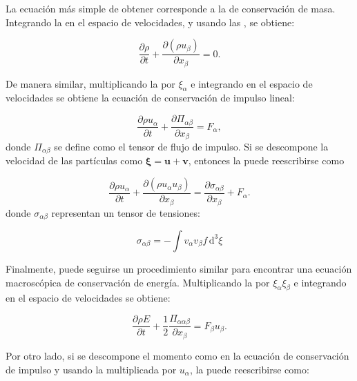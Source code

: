 La ecuaci\'on m\'as simple de obtener corresponde a la de conservaci\'on de masa. Integrando la  en el espacio de velocidades, y usando las , se obtiene:

\begin{equation}
	\dfrac{\partial \rho}{\partial t} + \dfrac{\partial (\rho u_{\beta})}{\partial x_{\beta}} = 0.
\end{equation}

De manera similar, multiplicando la  por $\xi_{\alpha}$ e integrando en el espacio de velocidades se obtiene la ecuaci\'on de conservaci\'on de impulso lineal:

\begin{equation}
	\dfrac{\partial \rho u_{\alpha}}{\partial t} + \dfrac{\partial \Pi_{\alpha \beta}}{\partial x_{\beta}} = F_{\alpha},
	\label{eq:mom_flux}
\end{equation}
donde $\Pi_{\alpha \beta}$ se define como el tensor de flujo de impulso. Si se descompone la velocidad de las part\'iculas como $\bm{\xi} = \bm{u} + \bm{v}$, entonces la  puede reescribirse como

\begin{equation}
	\dfrac{\partial \rho u_{\alpha}}{\partial t} 
	+ \dfrac{\partial (\rho u_{\alpha} u_{\beta})}{\partial x_{\beta}} = 
	\dfrac{\partial \sigma_{\alpha \beta}}{\partial x_{\beta}} + F_{\alpha}.
	\label{eq:impulso}
\end{equation}
donde $\sigma_{\alpha \beta}$ representan un tensor de tensiones:

\begin{equation}
	\sigma_{\alpha \beta} = -\int v_{\alpha} v_{\beta} f \, \mbox{d}^3 \xi
\end{equation}

Finalmente, puede seguirse un procedimiento similar para encontrar una ecuaci\'on macrosc\'opica de conservaci\'on de energ\'ia. Multiplicando la  por $\xi_{\alpha} \xi_{\beta}$ e integrando en el espacio de velocidades se obtiene:

\begin{equation}
	\dfrac{\partial \rho E}{\partial t} + \dfrac{1}{2} \dfrac{\Pi_{\alpha\alpha\beta}}{\partial x_{\beta}} = F_{\beta} u_{\beta}.
	\label{eq:energy_flux}
\end{equation}

Por otro lado,  si se descompone el momento como en la ecuaci\'on de conservaci\'on de impulso y usando la  multiplicada por $u_{\alpha}$, la  puede reescribirse como:

